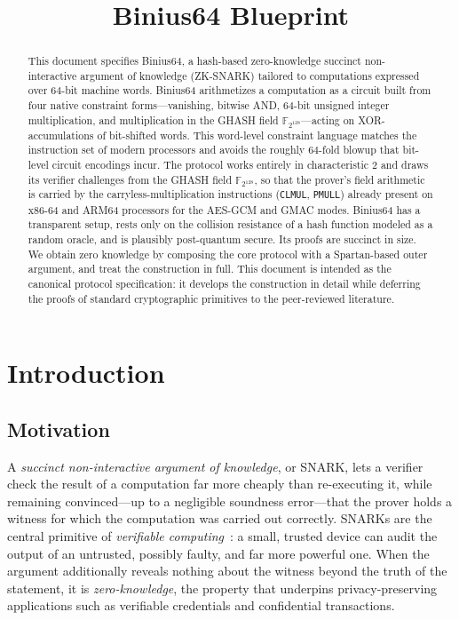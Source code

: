 \documentclass{article}
\title{Binius64 Blueprint}
\theoremstyle{definition}
\newcommand{\FF}[1]{\mathbb{F}_{#1}}
\begin{document}
\maketitle

\begin{abstract}
This document specifies Binius64, a hash-based zero-knowledge succinct non-interactive argument of knowledge (ZK-SNARK) tailored to computations expressed over $64$-bit machine words. Binius64 arithmetizes a computation as a circuit built from four native constraint forms---vanishing, bitwise AND, $64$-bit unsigned integer multiplication, and multiplication in the GHASH field $\FF{2^{128}}$---acting on XOR-accumulations of bit-shifted words. This word-level constraint language matches the instruction set of modern processors and avoids the roughly $64$-fold blowup that bit-level circuit encodings incur. The protocol works entirely in characteristic $2$ and draws its verifier challenges from the GHASH field $\FF{2^{128}}$, so that the prover's field arithmetic is carried by the carryless-multiplication instructions (\texttt{CLMUL}, \texttt{PMULL}) already present on x86-64 and ARM64 processors for the AES-GCM and GMAC modes. Binius64 has a transparent setup, rests only on the collision resistance of a hash function modeled as a random oracle, and is plausibly post-quantum secure. Its proofs are succinct in size. We obtain zero knowledge by composing the core protocol with a Spartan-based outer argument, and treat the construction in full. This document is intended as the canonical protocol specification: it develops the construction in detail while deferring the proofs of standard cryptographic primitives to the peer-reviewed literature.
\end{abstract}

\tableofcontents

\section{Introduction}

\subsection{Motivation}

A \emph{succinct non-interactive argument of knowledge}, or SNARK, lets a verifier check the result of a computation far more cheaply than re-executing it, while remaining convinced---up to a negligible soundness error---that the prover holds a witness for which the computation was carried out correctly. SNARKs are the central primitive of \emph{verifiable computing}~\cite{Setty:2020aa}: a small, trusted device can audit the output of an untrusted, possibly faulty, and far more powerful one. When the argument additionally reveals nothing about the witness beyond the truth of the statement, it is \emph{zero-knowledge}, the property that underpins privacy-preserving applications such as verifiable credentials and confidential transactions.
\end{document}
